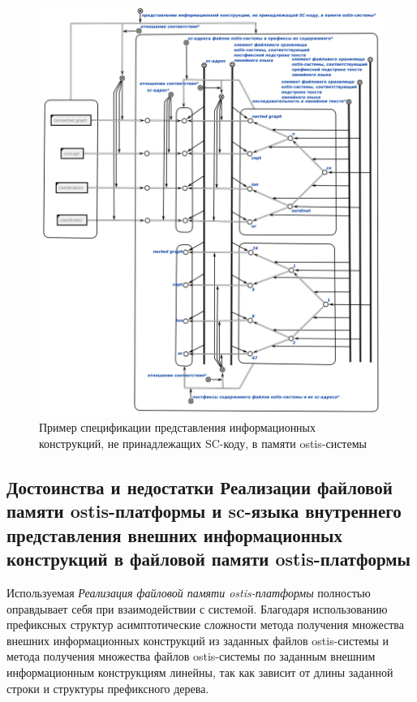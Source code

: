 \begin{figure}[htbp]
	\center
	\includegraphics[scale=0.6]{author/part6/figures/file_in_memory_representation.png}
	\caption{Пример спецификации представления информационных конструкций, не принадлежащих SC-коду, в памяти ostis-системы}
	\label{fig:file_in_memory_representation}
\end{figure}

\subsection{Достоинства и недостатки Реализации файловой памяти ostis-платформы и sc-языка внутреннего представления внешних информационных конструкций в файловой памяти ostis-платформы}
\label{sec_soft_platform_scfin_code_problems}

Используемая \textit{Реализация файловой памяти ostis-платформы} полностью оправдывает себя при взаимодействии с системой. Благодаря использованию префиксных структур асимптотические сложности метода получения множества внешних информационных конструкций из заданных файлов ostis-системы и метода получения множества файлов ostis-системы по заданным внешним информационным конструкциям линейны, так как зависит от длины заданной строки и структуры префиксного дерева.

